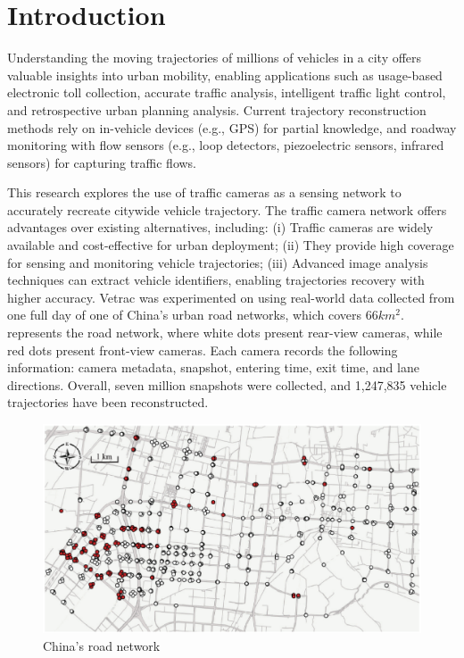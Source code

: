\section{Introduction}
\label{sec:introduction}
Understanding the moving trajectories of millions of vehicles in a city offers valuable insights into urban mobility, enabling applications such as usage-based electronic toll collection, accurate traffic analysis, intelligent traffic light control, and retrospective urban planning analysis.
Current trajectory reconstruction methods rely on in-vehicle devices (e.g., GPS) for partial knowledge, and roadway monitoring with flow sensors (e.g., loop detectors, piezoelectric sensors, infrared sensors) for capturing traffic flows.

This research explores the use of traffic cameras as a sensing network to accurately recreate citywide vehicle trajectory.
The traffic camera network offers advantages over existing alternatives, including: (i) Traffic cameras are widely available and cost-effective for urban deployment; (ii) They provide high coverage for sensing and monitoring vehicle trajectories; (iii) Advanced image analysis techniques can extract vehicle identifiers, enabling trajectories recovery with higher accuracy.
Vetrac was experimented on using real-world data collected from one full day of one of China's urban road networks, which covers $66 km^2$.
 represents the road network, where white dots present rear-view cameras, while red dots present front-view cameras.
Each camera records the following information: camera metadata, snapshot, entering time, exit time, and lane directions.
Overall, seven million snapshots were collected, and 1,247,835 vehicle trajectories have been reconstructed.

\begin{figure}
\centering
  \includegraphics[width=0.9\linewidth]{figures/china-road-network.eps}
  \caption{China's road network \cite{tong2021large}}
  \label{fig:china-road-representation}
\end{figure}

